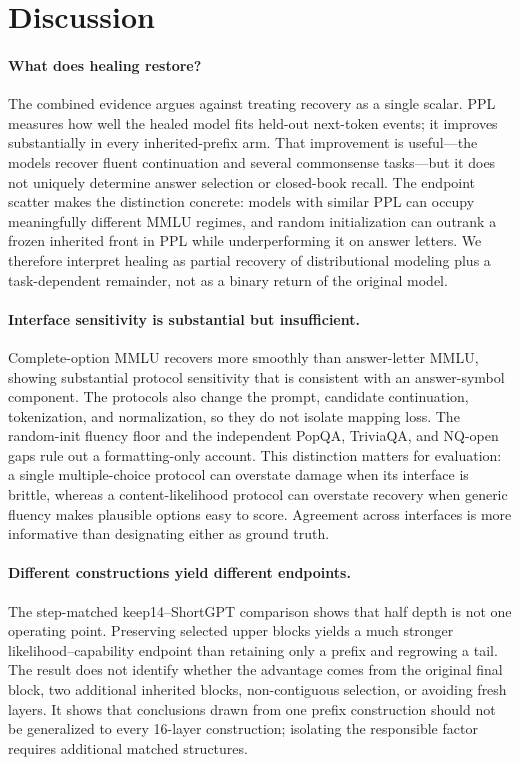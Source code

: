 \section{Discussion}
\label{sec:discussion}

\paragraph{What does healing restore?}
The combined evidence argues against treating recovery as a single scalar. PPL
measures how well the healed model fits held-out next-token events; it improves
substantially in every inherited-prefix arm. That improvement is useful---the
models recover fluent continuation and several commonsense tasks---but it does
not uniquely determine answer selection or closed-book recall. The endpoint
scatter makes the distinction concrete: models with similar PPL can occupy
meaningfully different MMLU regimes, and random initialization can outrank a
frozen inherited front in PPL while underperforming it on answer letters. We
therefore interpret healing as partial recovery of distributional modeling plus
a task-dependent remainder, not as a binary return of the original model.

\paragraph{Interface sensitivity is substantial but insufficient.}
Complete-option MMLU recovers more smoothly than answer-letter MMLU, showing
substantial protocol sensitivity that is consistent with an answer-symbol
component. The protocols also change the prompt, candidate continuation,
tokenization, and normalization, so they do not isolate mapping loss. The
random-init fluency floor and the independent PopQA, TriviaQA,
and NQ-open gaps rule out a formatting-only account. This distinction matters
for evaluation: a single multiple-choice protocol can overstate damage when its
interface is brittle, whereas a content-likelihood protocol can overstate
recovery when generic fluency makes plausible options easy to score. Agreement
across interfaces is more informative than designating either as ground truth.

\paragraph{Different constructions yield different endpoints.}
The step-matched keep14--ShortGPT comparison shows that half depth is not one
operating point. Preserving selected upper blocks yields a much stronger
likelihood--capability endpoint than retaining only a prefix and regrowing a
tail. The result does not identify whether the advantage comes from the
original final block, two additional inherited blocks, non-contiguous selection,
or avoiding fresh layers. It shows that conclusions drawn from one prefix
construction should not be generalized to every 16-layer construction;
isolating the responsible factor requires additional matched structures.

